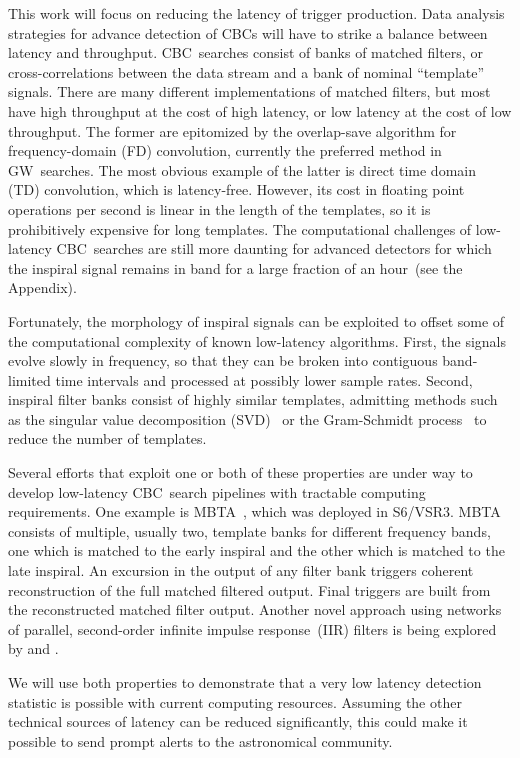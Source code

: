 \documentclass[preprint2]{aastex}
\newcommand{\mbta}{MBTA}
\newcommand{\GW}{GW}%
\newcommand{\CBC}{CBC}%
\newcommand{\SVD}{SVD}%
\newcommand{\TD}{TD}%
\newcommand{\FD}{FD}%
\begin{document}
This work will focus on reducing the latency of trigger production.  Data
analysis strategies for advance detection of \CBC{}s will have to strike a
balance between latency and throughput. \CBC\ searches consist of banks of
matched filters, or cross-correlations between the data stream and a bank of
nominal ``template'' signals.  There are many different implementations of
matched filters, but most have high throughput at the cost of high latency, or
low latency at the cost of low throughput.  The former are epitomized by the
overlap-save algorithm for frequency-domain (\FD) convolution, currently the
preferred method in \GW\ searches.  The most obvious example of the latter is
direct time domain (\TD) convolution, which is latency-free.  However, its cost in floating
point operations per second is linear in the length of the templates, so it is
prohibitively expensive for long templates.  The computational challenges of low-latency \CBC\ searches are still more daunting for advanced detectors for which the inspiral signal remains in band for a large fraction of an hour~(see the Appendix).

Fortunately, the morphology of inspiral signals can be exploited to offset some
of the computational complexity of known low-latency algorithms.  First, the signals
evolve slowly in frequency, so that they can be broken into contiguous
band-limited time intervals and processed at possibly lower sample rates.
Second, inspiral filter banks consist of highly similar templates, admitting
methods such as the singular value decomposition (\SVD)~\citep{Cannon:2010p10398}
or the Gram-Schmidt process~\citep{rbf} to reduce the number of templates.

Several efforts that exploit one or both of these properties are under way to
develop low-latency \CBC\ search pipelines with tractable computing requirements.
One example is \mbta{}~\citep{Marion2004, Buskulic2010}, which was deployed in
S6/VSR3.  MBTA consists of multiple, usually two, template banks for different frequency bands, one which is matched to the early inspiral and the other which is matched to the late inspiral.  An excursion in the output of any filter bank triggers coherent reconstruction of the full matched filtered output.  Final triggers are built from the reconstructed matched filter output.  Another novel approach using networks of parallel, second-order infinite impulse response~(IIR) filters is being explored
by \citet{shaunIIR} and \citet{linqingIIR}.

We will use both properties to demonstrate that a very low latency detection statistic
is possible with current computing resources.  Assuming the other technical
sources of latency can be reduced significantly, this could make it possible to
send prompt alerts to the astronomical community.
\end{document}
